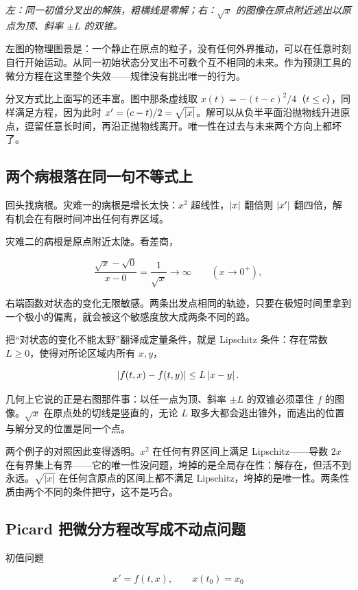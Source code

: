 \emph{左：同一初值分叉出的解族，粗横线是零解；右：\(\sqrt{x}\) 的图像在原点附近逃出以原点为顶、斜率 \(\pm L\) 的双锥。}

左图的物理图景是：一个静止在原点的粒子，没有任何外界推动，可以在任意时刻自行开始运动。从同一初始状态分叉出不可数个互不相同的未来。作为预测工具的微分方程在这里整个失效——规律没有挑出唯一的行为。

分叉方式比上面写的还丰富。图中那条虚线取 \(x(t)=-(t-c)^2/4\)（\(t\le c\)），同样满足方程，因为此时 \(x'=(c-t)/2=\sqrt{\left|x\right|}\)。解可以从负半平面沿抛物线升进原点，逗留任意长时间，再沿正抛物线离开。唯一性在过去与未来两个方向上都坏了。

\subsection{两个病根落在同一句不等式上}

回头找病根。灾难一的病根是增长太快：\(x^2\) 超线性，\(\left|x\right|\) 翻倍则 \(\left|x'\right|\) 翻四倍，解有机会在有限时间冲出任何有界区域。

灾难二的病根是原点附近太陡。看差商，

\[
\frac{\sqrt{x}-\sqrt{0}}{x-0}=\frac{1}{\sqrt{x}}\to\infty
\qquad(x\to0^{+}),
\]

右端函数对状态的变化无限敏感。两条出发点相同的轨迹，只要在极短时间里拿到一个极小的偏离，就会被这个敏感度放大成两条不同的路。

把``对状态的变化不能太野''翻译成定量条件，就是 Lipschitz 条件：存在常数 \(L\ge0\)，使得对所论区域内所有 \(x,y\)，

\[
\left|f(t,x)-f(t,y)\right|\le L\left|x-y\right|.
\]

几何上它说的正是右图那件事：以任一点为顶、斜率 \(\pm L\) 的双锥必须罩住 \(f\) 的图像。\(\sqrt{x}\) 在原点处的切线是竖直的，无论 \(L\) 取多大都会逃出锥外，而逃出的位置与解分叉的位置是同一个点。

两个例子的对照因此变得透明。\(x^2\) 在任何有界区间上满足 Lipschitz——导数 \(2x\) 在有界集上有界——它的唯一性没问题，垮掉的是全局存在性：解存在，但活不到永远。\(\sqrt{\left|x\right|}\) 在任何含原点的区间上都不满足 Lipschitz，垮掉的是唯一性。两条性质由两个不同的条件把守，这不是巧合。

\subsection{Picard 把微分方程改写成不动点问题}

初值问题

\[
x'=f(t,x),\qquad x(t_0)=x_0
\]

